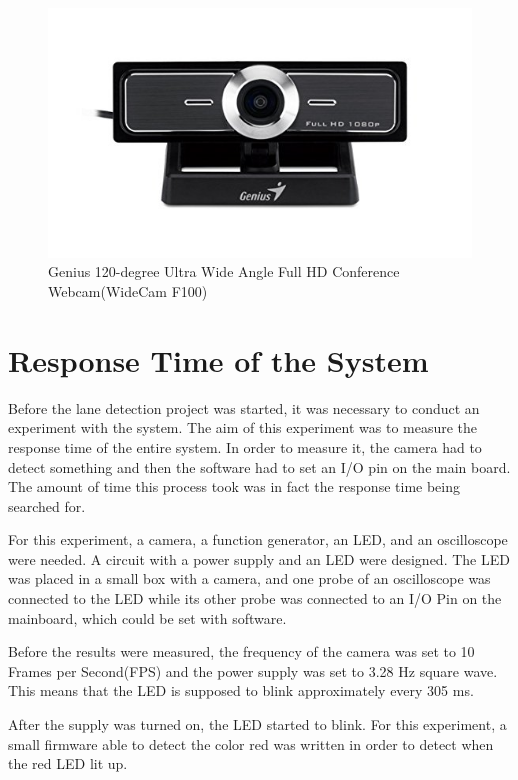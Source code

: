 \begin{figure}[H]
 \centering
  \includegraphics[width=1\textwidth]{./Bilder/Genius_F100_camera.png}	
   \caption{Genius 120-degree Ultra Wide Angle Full HD Conference Webcam(WideCam F100) }
  \label{fig:Genius-Camera}
\end{figure}






\section{Response Time of the System}\label{sec:Response Time of the System}

Before the lane detection project was started, it was necessary to conduct an experiment with the system. The aim of this experiment was to measure the response time of the entire system. In order to measure it, the camera had to detect something and then the software had to set an I/O pin on the main board. The amount of time this process took was in fact the response time being searched for.

For this experiment, a camera, a function generator, an LED, and an oscilloscope were needed. A circuit with a power supply and an LED were designed. The LED was placed in a small box with a camera, and one probe of an oscilloscope was connected to the LED while its other probe was connected to an I/O Pin on the mainboard, which could be set with software.

Before the results were measured, the frequency of the camera was set to 10 Frames per Second(FPS) and the power supply was set to 3.28 Hz square wave. This means that the LED is supposed to blink approximately every 305 ms.

After the supply was turned on, the LED started to blink. For this experiment, a small firmware able to detect the color red was written in order to detect when the red LED lit up.

